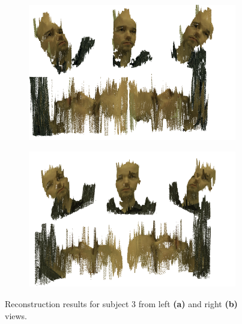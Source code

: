 \documentclass[journal]{IEEEtran}
\begin{document}
\begin{figure}
    \centering
    \begin{subfigure}[t]{\linewidth}
        \centering
        \includegraphics[width=\linewidth]{result_S4_R}
		\caption{}
		\label{fig:result_S3_R}
    \end{subfigure}
    
    \begin{subfigure}[t]{\linewidth}
        \centering
		\includegraphics[width=\linewidth]{result_S4_L}
		\caption{}
		\label{fig:result_S3_L}
    \end{subfigure}    
	\caption{Reconstruction results for subject 3 from left \textbf{(a)} and right \textbf{(b)} views.}
	\label{fig:results_S3-reconstruction}
\end{figure}
\end{document}
